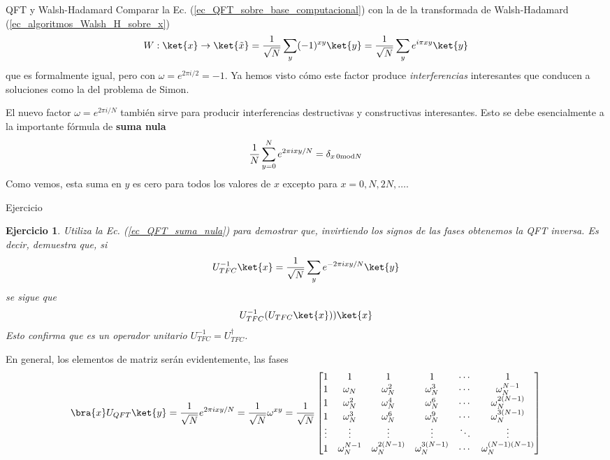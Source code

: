 \documentclass[a4paper,11pt]{book} %
\newtheorem{ejercicio_contador}{Ejercicio}
\newcommand{\Ejercicio}[1]{
		\begin{mybox_gray}{Ejercicio} 
			\begin{ejercicio_contador}
				 #1 
			\end{ejercicio_contador} 
		\end{mybox_gray}
	}
\numberwithin{equation}{chapter}
\begin{document}
	\begin{mybox_blue}{QFT y Walsh-Hadamard}
	Comparar la Ec. (\ref{ec_QFT_sobre_base_computacional}) con la de la transformada de Walsh-Hadamard (\ref{ec_algoritmos_Walsh_H_sobre_x})
	$$
	W: \ket{x} \to \ket{\tilde x} =  \frac{1}{\sqrt{N}}\sum_{y}(-1)^{xy}\ket{y} =   \frac{1}{\sqrt{N}}\sum_{y} e^{i\pi   xy} \ket{y} 
	$$
	que es formalmente igual, pero con $\omega = e^{2\pi i/2} = -1$.
    Ya hemos visto cómo este factor produce \textit{interferencias} interesantes que conducen a soluciones como la del problema de Simon. 
	\end{mybox_blue}

El nuevo factor $\omega = e^{2\pi i/N}$ también sirve para producir interferencias destructivas y constructivas interesantes. Esto se debe esencialmente a la importante fórmula de \textbf{suma nula}
	\begin{equation} \label{ec_QFT_suma_nula}
	\frac{1}{N} \sum_{y=0}^{N} e^{2\pi i xy/N} = \delta_{x \, 0 {\rm mod}N}
	\end{equation}
Como vemos, esta suma en $y$ es cero para todos los valores de $x$ excepto para $x = 0, N, 2N, \dots$.

	\Ejercicio{Utiliza la Ec. (\ref{ec_QFT_suma_nula}) para demostrar que, invirtiendo los signos de las fases obtenemos la QFT inversa. Es decir, demuestra que, si  
	$$
	U^{-1}_{TFC}\ket{x}  =  \frac{1}{\sqrt{N}}\sum_{y} e^{-2\pi i  xy /N} \ket{y} 
	$$
	se sigue que     
	$$
	U_{TFC}^{-1}(U_{TFC} \ket{x}) ) \ket{x}
	$$
	Esto confirma que es un operador unitario $U_{TFC}^{-1} = U_{TFC}^\dagger$.
	}

En general, los elementos de matriz serán evidentemente, las fases
	\begin{equation*}
	\bra{x} U_{QFT} \ket{y} =  \frac{1}{\sqrt{N}} e^{2\pi i  x y/N} =\frac{1}{\sqrt{N}} \omega^{xy}
 = \frac{1}{\sqrt{N}} \begin{bmatrix}
1&1&1&1&\cdots &1 \\
1&\omega_N&\omega_N^2&\omega_N^3&\cdots&\omega_N^{N-1} \\
1&\omega_N^2&\omega_N^4&\omega_N^6&\cdots&\omega_N^{2(N-1)}\\ 1&\omega_N^3&\omega_N^6&\omega_N^9&\cdots&\omega_N^{3(N-1)}\\
\vdots&\vdots&\vdots&\vdots&\ddots&\vdots\\
1&\omega_N^{N-1}&\omega_N^{2(N-1)}&\omega_N^{3(N-1)}&\cdots&\omega_N^{(N-1)(N-1)}
\end{bmatrix}
	\end{equation*}
	
\end{document}

